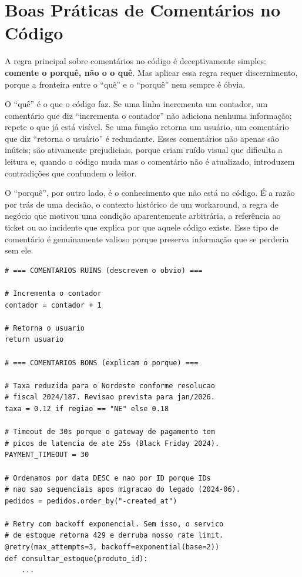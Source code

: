 \section{Boas Práticas de Comentários no Código}

A regra principal sobre comentários no código é deceptivamente
simples: \textbf{comente o porquê, não o o quê}. Mas aplicar essa
regra requer discernimento, porque a fronteira entre o
``quê'' e o ``porquê'' nem sempre é óbvia.

O ``quê'' é o que o código faz. Se uma linha incrementa um contador,
um comentário que diz ``incrementa o contador'' não adiciona nenhuma
informação; repete o que já está visível. Se uma função retorna
um usuário, um comentário que diz ``retorna o usuário'' é redundante.
Esses comentários não apenas são inúteis; são ativamente prejudiciais,
porque criam ruído visual que dificulta a leitura e, quando o código
muda mas o comentário não é atualizado, introduzem contradições que
confundem o leitor.

O ``porquê'', por outro lado, é o conhecimento que não está no código.
É a razão por trás de uma decisão, o contexto histórico de um
workaround, a regra de negócio que motivou uma condição aparentemente
arbitrária, a referência ao ticket ou ao incidente que explica por
que aquele código existe. Esse tipo de comentário é genuinamente
valioso porque preserva informação que se perderia sem ele.

\begin{lstlisting}[language={}, caption={Comentários: Bons vs. Ruins}]
# === COMENTARIOS RUINS (descrevem o obvio) ===

# Incrementa o contador
contador = contador + 1

# Retorna o usuario
return usuario

# === COMENTARIOS BONS (explicam o porque) ===

# Taxa reduzida para o Nordeste conforme resolucao
# fiscal 2024/187. Revisao prevista para jan/2026.
taxa = 0.12 if regiao == "NE" else 0.18

# Timeout de 30s porque o gateway de pagamento tem
# picos de latencia de ate 25s (Black Friday 2024).
PAYMENT_TIMEOUT = 30

# Ordenamos por data DESC e nao por ID porque IDs
# nao sao sequenciais apos migracao do legado (2024-06).
pedidos = pedidos.order_by("-created_at")

# Retry com backoff exponencial. Sem isso, o servico
# de estoque retorna 429 e derruba nosso rate limit.
@retry(max_attempts=3, backoff=exponential(base=2))
def consultar_estoque(produto_id):
    ...
\end{lstlisting}

